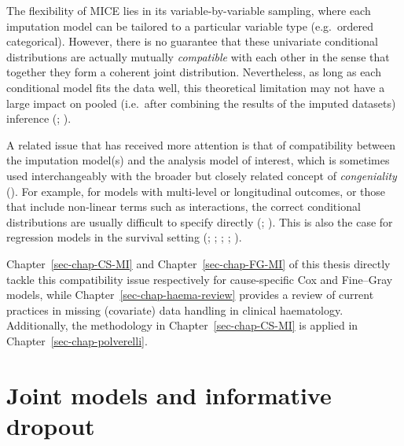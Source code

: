 \documentclass[
  letterpaper,
  paper=240mm:170mm,
  twoside=true,
  open=right,
  fontsize=10pt,
  pagesize=false,
  BCOR=15mm,
  DIV=14,
  headinclude=true,
  footinclude=false,
  headsepline=on]{scrbook}
\begin{document}
The flexibility of MICE lies in its variable-by-variable sampling, where
each imputation model can be tailored to a particular variable type
(e.g.~ordered categorical). However, there is no guarantee that these
univariate conditional distributions are actually mutually
\emph{compatible} with each other in the sense that together they form a
coherent joint distribution. Nevertheless, as long as each conditional
model fits the data well, this theoretical limitation may not have a
large impact on pooled (i.e.~after combining the results of the imputed
datasets) inference
(; ).

A related issue that has received more attention is that of
compatibility between the imputation model(s) and the analysis model of
interest, which is sometimes used interchangeably with the broader but
closely related concept of \emph{congeniality}
(). For example, for models with multi-level or longitudinal
outcomes, or those that include non-linear terms such as interactions,
the correct conditional distributions are usually difficult to specify
directly (;
). This is also the case for regression models in the survival
setting (;
;
;
; ).

Chapter~\ref{sec-chap-CS-MI} and Chapter~\ref{sec-chap-FG-MI} of this
thesis directly tackle this compatibility issue respectively for
cause-specific Cox and Fine--Gray models, while
Chapter~\ref{sec-chap-haema-review} provides a review of current
practices in missing (covariate) data handling in clinical haematology.
Additionally, the methodology in Chapter~\ref{sec-chap-CS-MI} is applied
in Chapter~\ref{sec-chap-polverelli}.

\section{Joint models and informative dropout}\label{sec-intro-jms}
\end{document}
